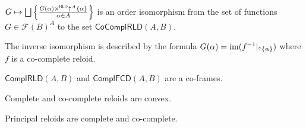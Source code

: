\begin{cor}
$G\mapsto\bigsqcup\setcond{G(\alpha)\times^{\mathsf{RLD}}\uparrow^{A}\{\alpha\}}{\alpha\in A}$
is an order isomorphism from the set of functions $G\in\mathscr{F}(B)^{A}$
to the set $\mathsf{CoComplRLD}(A,B)$.

The inverse isomorphism is described by the formula $G(\alpha)=\operatorname{im}(f^{-1}|_{\uparrow\{\alpha\}})$
where $f$ is a co-complete reloid.
\end{cor}

\begin{cor}
$\mathsf{ComplRLD}(A,B)$ and $\mathsf{ComplFCD}(A,B)$ are a co-frames.\end{cor}
\begin{obvious}
Complete and co-complete reloids are convex.
\end{obvious}

\begin{obvious}
Principal reloids are complete and co-complete.
\end{obvious}

